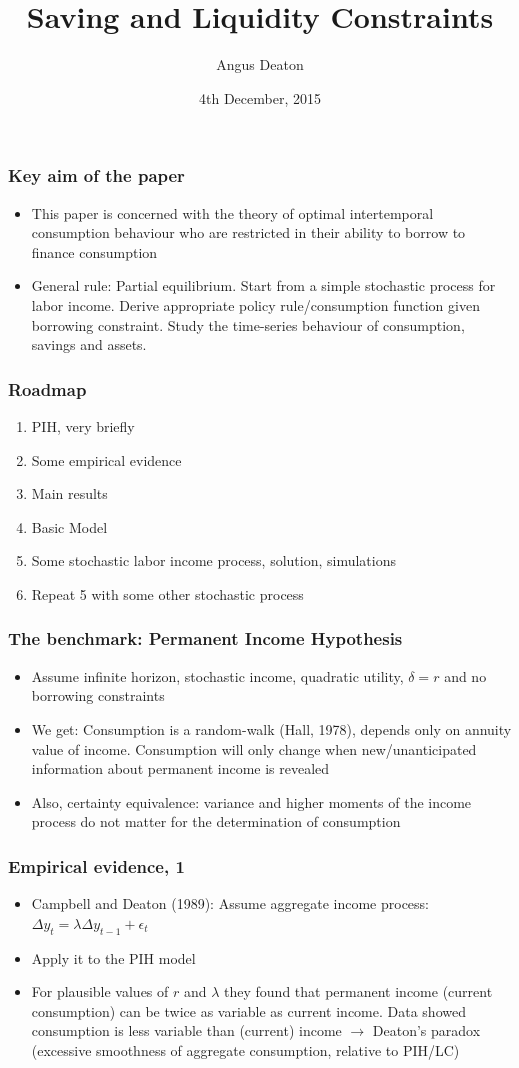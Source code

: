 \documentclass[mathserif]{beamer}
\title{Saving and Liquidity Constraints}
\author{Angus Deaton}
\institute{Econometrica, Volume 59, No. 5, September, 1991}
\date{4th December, 2015}
\begin{document}
\frame{\titlepage}
\begin{frame}
\frametitle{Key aim of the paper}
\begin{itemize}
    \setlength\itemsep{1em}
    \item This paper is concerned with the theory of optimal intertemporal consumption behaviour who are restricted in their ability to borrow to finance consumption
    \item General rule: Partial equilibrium. Start from a simple stochastic process for labor income. Derive appropriate policy rule/consumption function given borrowing constraint. Study the time-series behaviour of consumption, savings and assets.
\end{itemize}
\end{frame}

\begin{frame}
\frametitle{Roadmap}
\begin{enumerate}
  \item PIH, very briefly
  \item Some empirical evidence
  \item Main results
  \item Basic Model
  \item Some stochastic labor income process, solution, simulations
  \item Repeat 5 with some other stochastic process
\end{enumerate}
\end{frame}

\begin{frame}
\frametitle{The benchmark: Permanent Income Hypothesis}
\begin{itemize}
  \setlength\itemsep{1em}
  \item Assume infinite horizon, stochastic income, quadratic utility, \(\delta = r\) and no borrowing constraints
  \item We get: Consumption is a random-walk (Hall, 1978), depends only on annuity value of income. Consumption will only change when new/unanticipated information about permanent income is revealed
  \item Also, certainty equivalence: variance and higher moments of the income process do not matter for the determination of consumption
\end{itemize}
\end{frame}

\begin{frame}
\frametitle{Empirical evidence, 1}
\begin{itemize}
  \setlength\itemsep{1em}
  \item Campbell and Deaton (1989): Assume aggregate income process: \(\Delta y_{t} = \lambda \Delta y_{t-1} + \epsilon_{t}\) 
  \item Apply it to the PIH model
  \item For plausible values of $r$ and $\lambda$ they found that permanent income (current consumption) can be twice as variable as current income. Data showed consumption is less variable than (current) income $\rightarrow$ Deaton's paradox (excessive smoothness of aggregate consumption, relative to PIH/LC)
\end{itemize}
\end{frame}
\end{document}
